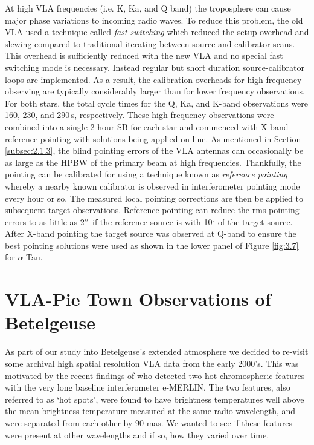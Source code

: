 At high VLA frequencies (i.e. K, Ka, and Q band) the troposphere can cause major phase variations to incoming radio waves. To reduce this problem, the old VLA used a technique called \textit{fast switching} \citep{carilli_1996} which reduced the setup overhead and slewing compared to traditional iterating between source and calibrator scans. This overhead is sufficiently reduced with the new VLA and no special fast switching mode is necessary. Instead regular but short duration source-calibrator loops are implemented. As a result, the calibration overheads for high frequency observing are typically considerably larger than for lower frequency observations. For both stars, the total cycle times for the Q, Ka, and K-band observations were 160, 230, and 290\,s, respectively. These high frequency observations were combined into a single 2 hour SB for each star and commenced with X-band reference pointing with solutions being applied on-line. As mentioned in Section \ref{subsec:2.1.3}, the blind pointing errors of the VLA antennas can occasionally be as large as the HPBW of the primary beam at high frequencies. Thankfully, the pointing can be calibrated for using a technique known as \textit{reference pointing} whereby a nearby known calibrator is observed in interferometer pointing mode every hour or so. The measured local pointing corrections are then be applied to subsequent target observations. Reference pointing can reduce the rms pointing errors to as little as 2$^{\prime\prime}$ if the reference source is with 10$^\circ$ of the target source. After X-band pointing the target source was observed at Q-band to ensure the best pointing solutions were used as shown in the lower panel of Figure \ref{fig:3.7} for $\alpha$ Tau.  

\section{VLA-Pie Town Observations of Betelgeuse}\label{sec:3.7}

As part of our study into Betelgeuse's extended atmosphere we decided to re-visit some archival high spatial resolution VLA data from the early 2000's. This was motivated by the recent findings of \cite{richards_2013} who detected two hot chromospheric features  with the very long baseline interferometer e-MERLIN. The two features, also referred to as `hot spots', were found to have brightness temperatures well above the mean brightness temperature measured at the same radio wavelength, and were separated from each other by 90 mas. We wanted to see if these features were present at other wavelengths and if so, how they varied over time.


